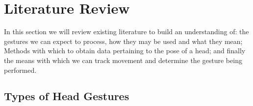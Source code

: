 \section{Literature Review} %

In this section we will review existing literature to build an understanding of: the gestures we can expect to process, how they may be used and what they mean; Methods with which to obtain data pertaining to the pose of a head; and finally the means with which we can track movement and determine the gesture being performed.




\subsection{Types of Head Gestures}

